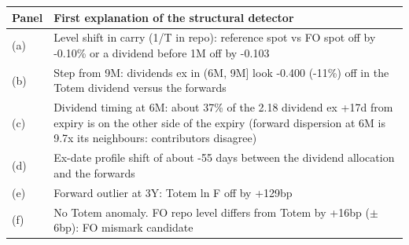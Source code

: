 {\footnotesize\begin{tabular}{lp{13.2cm}}
\toprule
Panel & First explanation of the structural detector \\
\midrule
(a) & Level shift in carry (1/T in repo): reference spot vs FO spot off by -0.10\% or a dividend before 1M off by -0.103 \\
(b) & Step from 9M: dividends ex in (6M, 9M] look -0.400 (-11\%) off in the Totem dividend versus the forwards \\
(c) & Dividend timing at 6M: about 37\% of the 2.18 dividend ex +17d from expiry is on the other side of the expiry (forward dispersion at 6M is 9.7x its neighbours: contributors disagree) \\
(d) & Ex-date profile shift of about -55 days between the dividend allocation and the forwards \\
(e) & Forward outlier at 3Y: Totem ln F off by +129bp \\
(f) & No Totem anomaly. FO repo level differs from Totem by +16bp ($\pm$ 6bp): FO mismark candidate \\
\bottomrule
\end{tabular}}
